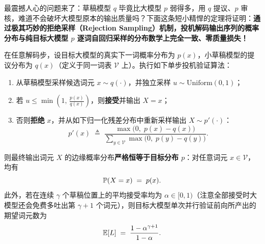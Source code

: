 最震撼人心的问题来了：草稿模型 $q$ 毕竟比大模型 $p$ 弱得多，用 $q$ 提议、$p$ 审核，难道不会破坏大模型原本的输出质量吗？下面这条短小精悍的定理将证明：\textbf{通过极其巧妙的拒绝采样（Rejection Sampling）机制，投机解码输出序列的概率分布与纯目标大模型 $p$ 逐词自回归采样的分布数学上完全一致、零质量损失！}

\begin{thmBox}
\begin{theorem}[投机解码的精确无损分布保持定理]
\label{thm:speculative-lossless}
在任意解码步，设目标大模型的真实下一词概率分布为 $p(x)$，小草稿模型的提议分布为 $q(x)$（定义于同一词表 $\mathcal{V}$ 上）。执行如下单步投机验证算法：
\begin{enumerate}
  \item 从草稿模型采样候选词元 $x \sim q(\cdot)$，并独立采样 $u \sim \mathrm{Uniform}(0, 1)$；
  \item 若 $u \le \min\!\left(1,\, \frac{p(x)}{q(x)}\right)$，则\textbf{接受}并输出 $X = x$；
  \item 否则\textbf{拒绝} $x$，并从如下归一化残差分布中重新采样输出 $X \sim p'(\cdot)$：
  \begin{equation}
    p'(x) \;\triangleq\; \frac{\max\!\big(0,\; p(x) - q(x)\big)}{\sum_{y \in \mathcal{V}} \max\!\big(0,\; p(y) - q(y)\big)}.
    \label{eq:spec-residual}
  \end{equation}
\end{enumerate}
则最终输出词元 $X$ 的边缘概率分布\textbf{严格恒等于目标分布 $p$}：对任意词元 $x \in \mathcal{V}$，均有
\begin{equation}
  \mathbb{P}(X = x) \;=\; p(x).
  \label{eq:spec-exact}
\end{equation}
此外，若在连续 $\gamma$ 个草稿位置上的平均接受率均为 $\alpha \in [0, 1)$（注意全部接受时大模型还会免费多吐出第 $\gamma + 1$ 个词元），则目标大模型单次并行验证前向所产出的期望词元数为
\begin{equation}
  \mathbb{E}[L] \;=\; \frac{1 - \alpha^{\gamma + 1}}{1 - \alpha}.
  \label{eq:spec-expected-len}
\end{equation}
\end{theorem}
\end{thmBox}

